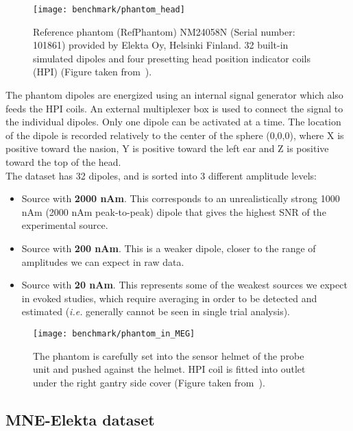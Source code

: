 \begin{figure}[tb]
   \centering
\texttt{[image: benchmark/phantom\_head]}
\caption{Reference phantom (RefPhantom) NM24058N (Serial number: 101861) provided by Elekta Oy, Helsinki Finland. 32 built-in simulated dipoles and four presetting head position indicator coils (HPI) (Figure taken from~\cite{hazim2015magnetoencephalography}).}
   \label{fig:phantom_head}
\end{figure}

The phantom dipoles are energized using an internal signal generator which also feeds the HPI coils. An external multiplexer box is used to connect the signal to the individual dipoles. Only one dipole can be activated at a time. The location of the dipole is recorded relatively to the center of the sphere (0,0,0), where X is positive toward the nasion, Y is positive toward the left ear and Z is positive toward the top of the head.\\

The dataset has 32 dipoles, and is sorted into 3 different amplitude levels:
\begin{itemize}
\item Source with \textbf{2000 nAm}. This corresponds to an unrealistically strong 1000 nAm (2000 nAm peak-to-peak) dipole that gives the highest SNR of the experimental source.
\item Source with \textbf{200 nAm}. This is a weaker dipole, closer to the range of amplitudes we can expect in raw data.
\item Source with \textbf{20 nAm}. This represents some of the weakest sources we expect in evoked studies, which require averaging in order to be detected and estimated (\textit{i.e.} generally cannot be seen in single trial analysis).
\end{itemize}

\begin{figure}[tb]
   \centering
\texttt{[image: benchmark/phantom\_in\_MEG]}
\caption{The phantom is carefully set into the sensor helmet of the probe unit and pushed against the helmet. HPI coil is fitted into outlet under the right gantry side cover (Figure taken from~\cite{hazim2015magnetoencephalography}).}
   \label{fig:phantom_in_MEG}
\end{figure}

\subsection{MNE-Elekta dataset} \label{data:used_data}

